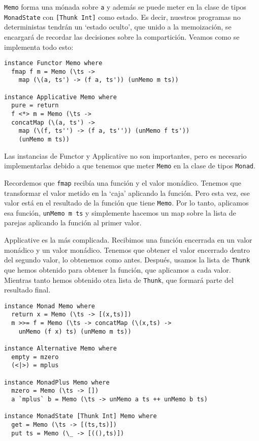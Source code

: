 \documentclass[class=article, crop=false]{standalone}
\begin{document}
\verb`Memo` forma una mónada sobre \verb`a` y además se puede meter en la clase de tipos
\verb`MonadState` con \verb`[Thunk Int]` como estado. Es decir, nuestros programas no
deterministas tendrán un `estado oculto', que unido a la memoización, se encargará de
recordar las decisiones sobre la compartición. Veamos como se implementa todo esto:

\begin{verbatim}
instance Functor Memo where
  fmap f m = Memo (\ts ->
    map (\(a, ts') -> (f a, ts')) (unMemo m ts))

instance Applicative Memo where
  pure = return
  f <*> m = Memo (\ts ->
  concatMap (\(a, ts') ->
    map (\(f, ts'') -> (f a, ts'')) (unMemo f ts'))
    (unMemo m ts))
\end{verbatim}

Las instancias de Functor y Applicative no son importantes, pero es necesario implementarlas
debido a que tenemos que meter \verb`Memo` en la clase de tipos \verb`Monad`.

Recordemos que \verb`fmap` recibía una función y el valor monádico. Tenemos que transformar
el valor metido en la `caja' aplicando la función. Pero esta vez, ese valor está en el
resultado de la función que tiene \verb`Memo`. Por lo tanto, aplicamos esa función,
\verb`unMemo m ts` y simplemente hacemos un map sobre la lista de parejas aplicando la
función al primer valor.

Applicative es la más complicada. Recibimos una función encerrada en un valor monádico y un
valor monádico. Tenemos que obtener el valor encerrado dentro del segundo valor, lo obtenemos
como antes. Después, usamos la lista de \verb`Thunk` que hemos obtenido para obtener la
función, que aplicamos a cada valor. Mientras tanto hemos obtenido otra lista de
\verb`Thunk`, que formará parte del resultado final.

\begin{verbatim}
instance Monad Memo where
  return x = Memo (\ts -> [(x,ts)])
  m >>= f = Memo (\ts -> concatMap (\(x,ts) ->
    unMemo (f x) ts) (unMemo m ts))

instance Alternative Memo where
  empty = mzero
  (<|>) = mplus

instance MonadPlus Memo where
  mzero = Memo (\ts -> [])
  a `mplus` b = Memo (\ts -> unMemo a ts ++ unMemo b ts)

instance MonadState [Thunk Int] Memo where
  get = Memo (\ts -> [(ts,ts)])
  put ts = Memo (\_ -> [((),ts)])
\end{verbatim}
\end{document}
